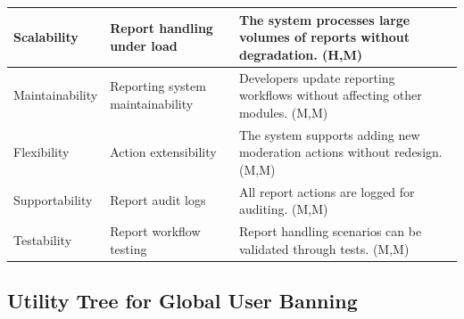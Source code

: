 \documentclass{article}
\begin{document}
\begin{table}[H]
\begin{tabular}{|p{3cm}|p{4cm}|p{7cm}|}
        Scalability
                                   & Report handling under load
                                   & The system processes large volumes of reports without degradation. (H,M)                                                 \\
        \hline

        Maintainability
                                   & Reporting system maintainability
                                   & Developers update reporting workflows without affecting other modules. (M,M)                                             \\
        \hline

        Flexibility
                                   & Action extensibility
                                   & The system supports adding new moderation actions without redesign. (M,M)                                                \\
        \hline

        Supportability
                                   & Report audit logs
                                   & All report actions are logged for auditing. (M,M)                                                                        \\
        \hline

        Testability
                                   & Report workflow testing
                                   & Report handling scenarios can be validated through tests. (M,M)                                                          \\
        \hline
    \end{tabular}
\end{table}

\subsection{Utility Tree for Global User Banning}
\end{document}
